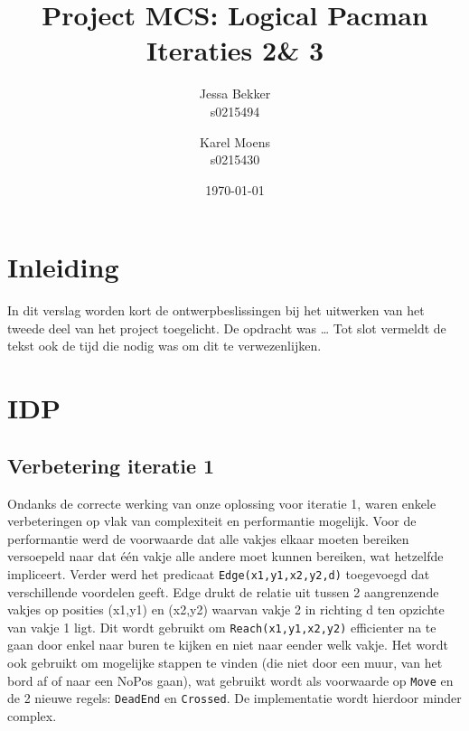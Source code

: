 \documentclass[a4paper,12pt]{article}
\title{Project MCS: Logical Pacman \\ Iteraties 2\& 3}
\author{Jessa Bekker\\s0215494 \and Karel Moens \\ s0215430 }
\date{\today}
\begin{document}
\maketitle


\section{Inleiding}
In dit verslag worden kort de ontwerpbeslissingen bij het uitwerken van het tweede deel van het project toegelicht.
De opdracht was \dots
Tot slot vermeldt de tekst ook de tijd die nodig was om dit te verwezenlijken.

\section{IDP}
\subsection{Verbetering iteratie 1}
Ondanks de correcte werking van onze oplossing voor iteratie 1, waren enkele verbeteringen op vlak van complexiteit en performantie mogelijk. Voor de performantie werd de voorwaarde dat alle vakjes elkaar moeten bereiken versoepeld naar dat \'e\'en vakje alle andere moet kunnen bereiken, wat hetzelfde impliceert. Verder werd het predicaat \texttt{Edge(x1,y1,x2,y2,d)} toegevoegd dat verschillende voordelen geeft. Edge drukt de relatie uit tussen 2 aangrenzende vakjes op posities (x1,y1) en (x2,y2) waarvan vakje 2 in richting d ten opzichte van vakje 1 ligt. Dit wordt gebruikt om \texttt{Reach(x1,y1,x2,y2)} efficienter na te gaan door enkel naar buren te kijken en niet naar eender welk vakje. Het wordt ook gebruikt om mogelijke stappen te vinden (die niet door een muur, van het bord af of naar een NoPos gaan), wat gebruikt wordt als voorwaarde op \texttt{Move} en de 2 nieuwe regels: \texttt{DeadEnd} en \texttt{Crossed}. De implementatie wordt hierdoor minder complex.
\end{document}
